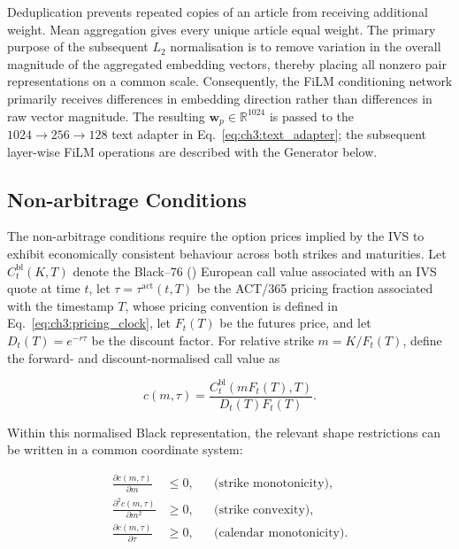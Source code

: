Deduplication prevents repeated copies of an article from receiving additional weight. Mean aggregation gives every unique article equal weight. The primary purpose of the subsequent \(L_2\) normalisation is to remove variation in the overall magnitude of the aggregated embedding vectors, thereby placing all nonzero pair representations on a common scale. Consequently, the FiLM conditioning network primarily receives differences in embedding direction rather than differences in raw vector magnitude. The resulting $\mathbf w_p\in\mathbb{R}^{1024}$ is passed to the $1024\rightarrow256\rightarrow128$ text adapter in Eq.~\eqref{eq:ch3:text_adapter}; the subsequent layer-wise FiLM operations are described with the Generator below.



\subsection*{Non-arbitrage Conditions}

The non-arbitrage conditions require the option prices implied by the IVS to
exhibit economically consistent behaviour across both strikes and maturities.
Let \(C_t^{\mathrm{bl}}(K,T)\) denote the Black--76 (\citet{black76}) European call
value associated with an IVS quote at time \(t\), let
\(\tau=\tau^{\mathrm{act}}(t,T)\) be the ACT/365 pricing fraction associated with the timestamp \(T\), whose pricing convention is defined in Eq.~\eqref{eq:ch3:pricing_clock}, let
\(F_t(T)\) be the futures price, and let
\(D_t(T)=e^{-r\tau}\) be the discount factor. For relative strike
\(m=K/F_t(T)\), define the forward- and discount-normalised call value as

\begin{equation}
c(m,\tau)
=
\frac{C_t^{\mathrm{bl}}\!\left(mF_t(T),T\right)}
     {D_t(T)F_t(T)}.
\label{eq:ch3:normalised_call_definition}
\end{equation}

Within this normalised Black representation, the relevant shape restrictions
can be written in a common coordinate system:

\begin{align}
\frac{\partial c(m,\tau)}{\partial m}
&\leq 0,
&& \text{(strike monotonicity)},
\label{eq:ch3:monotonicity}\\
\frac{\partial^2 c(m,\tau)}{\partial m^2}
&\geq 0,
&& \text{(strike convexity)},
\label{eq:ch3:convexity}\\
\frac{\partial c(m,\tau)}{\partial \tau}
&\geq 0,
&& \text{(calendar monotonicity)}.
\label{eq:ch3:calendar}
\end{align}

